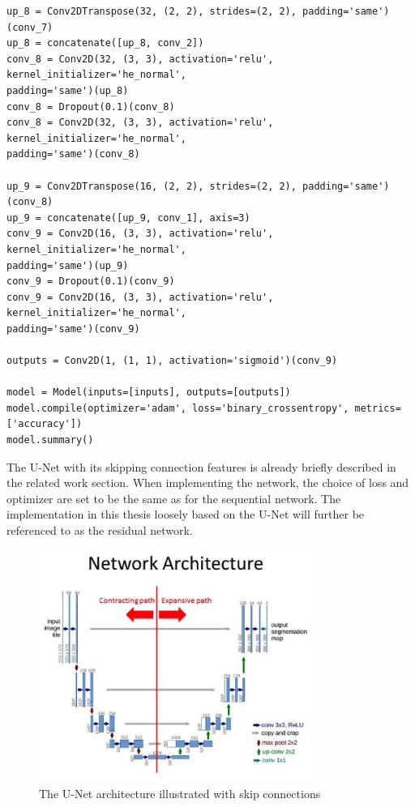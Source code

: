 \documentclass[USenglish]{ifimaster}  %
\begin{document}
\begin{verbatim}
up_8 = Conv2DTranspose(32, (2, 2), strides=(2, 2), padding='same')(conv_7)
up_8 = concatenate([up_8, conv_2])
conv_8 = Conv2D(32, (3, 3), activation='relu', kernel_initializer='he_normal', 
padding='same')(up_8)
conv_8 = Dropout(0.1)(conv_8)
conv_8 = Conv2D(32, (3, 3), activation='relu', kernel_initializer='he_normal', 
padding='same')(conv_8)

up_9 = Conv2DTranspose(16, (2, 2), strides=(2, 2), padding='same')(conv_8)
up_9 = concatenate([up_9, conv_1], axis=3)
conv_9 = Conv2D(16, (3, 3), activation='relu', kernel_initializer='he_normal', 
padding='same')(up_9)
conv_9 = Dropout(0.1)(conv_9)
conv_9 = Conv2D(16, (3, 3), activation='relu', kernel_initializer='he_normal', 
padding='same')(conv_9)

outputs = Conv2D(1, (1, 1), activation='sigmoid')(conv_9)

model = Model(inputs=[inputs], outputs=[outputs])
model.compile(optimizer='adam', loss='binary_crossentropy', metrics=['accuracy'])
model.summary()

\end{verbatim}

The U-Net with its skipping connection features is already briefly described in the related work section. When implementing the network, the choice of loss and optimizer are set to be the same as for the sequential network. The implementation in this thesis loosely based on the U-Net will further be referenced to as the residual network.

\begin{figure}[H]
    \centering
    \includegraphics[width=0.8\textwidth]{bilder/u-net_architecture_method.png}
    \caption{The U-Net architecture illustrated with skip connections \cite{website:u-net_method}}
    \label{fig:u_net_method_chapter}
\end{figure}
\end{document}
